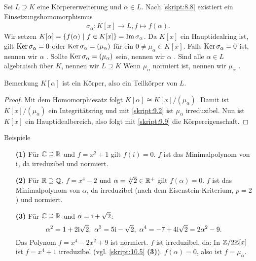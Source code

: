 \begin{df}\label{skript:13.4}
	Sei $L \supseteq K$ eine Körpererweiterung und $\alpha \in L$.
	Nach \ref{skript:8.8} existiert ein Einsetzungshomomorphismus
	\begin{align*}
	\sigma_\alpha : K[x] \to L, f \mapsto f(\alpha).
	\end{align*}
	Wir setzen $K[\alpha] = \lbrace f(\alpha) \ | \ f \in K[x] \rbrace = \operatorname{Im} \sigma_\alpha$.
	Da $K[x]$ ein Hauptidealring ist, gilt
	$\operatorname{Ker} \sigma_\alpha = 0$ oder $\operatorname{Ker} \sigma_\alpha = (\mu_\alpha)$ für ein $0 \neq \mu_\alpha \in K[x]$.
	Falls $\operatorname{Ker} \sigma_\alpha  = 0 $ ist, nennen wir $\alpha$ .
	Sollte $\operatorname{Ker} \sigma_\alpha = ( \mu_\alpha) $ sein,
	nennen wir $\alpha$ .
	Sind alle $\alpha \in L$ algebraisch über $K$, nennen wir $L \supseteq K$ 
	Wenn $\mu_\alpha$ normiert ist, nennen wir $\mu_\alpha $ .
\end{df}

\begin{generic_no_num}{Bemerkung}
	$K[\alpha]$ ist ein Körper, also ein Teilkörper von $L$.
\end{generic_no_num}

\begin{proof}
	Mit dem Homomorphiesatz folgt $K[\alpha] \cong K[x] / (\mu_\alpha)$.
	Damit ist $K[x] / (\mu_\alpha)$ ein Integritätsring und mit \ref{skript:9.2}
	ist $\mu_\alpha$ irreduzibel.
	Nun ist $K[x]$ ein Hauptidealbereich, also folgt mit \ref{skript:9.9}
	die Körpereigenschaft.
\end{proof}

\begin{genericdf}{Beispiele}\label{skript:13.5}\
	\begin{enumerate}
		\item[\textbf{(1)}]
		Für $\mathbb{C} \supseteq \mathbb{R}$ und $f=x^2+1$ gilt $f(i)=0$. $f$ ist das Minimalpolynom von $\textrm{i}$, da irreduzibel und normiert.
		\item[\textbf{(2)}]
		Für $\mathbb{R} \supseteq \mathbb{Q}$, $f=x^4-2$ und $\alpha=\sqrt[4]{2}\in\mathbb{R}^+$ gilt $f(\alpha)=0$. $f$ ist das Minimalpolynom von $\alpha$, da irreduzibel (nach dem Eisenstein-Kriterium, $p=2$) und normiert.
		\item[\textbf{(3)}]
		Für $\mathbb{C} \supseteq \mathbb{R}$ und $\alpha=\textrm{i}+\sqrt{2}$:
		\[\alpha^2=1+2\textrm{i}\sqrt{2}, \ \alpha^3=5\textrm{i}-\sqrt{2}, \ \alpha^4=-7+4\textrm{i}\sqrt{2}=2\alpha^2-9.\]
		Das Polynom $f=x^4-2x^2+9$ ist normiert. $f$ ist irreduzibel, da: In $\mathbb{Z}/2\mathbb{Z}[x]$ ist $f=x^4+1$ irreduzibel (vgl. \ref{skript:10.5} \textbf{(3)}). $f(\alpha)=0$, also ist $f=\mu_\alpha$.
	\end{enumerate}
\end{genericdf}

